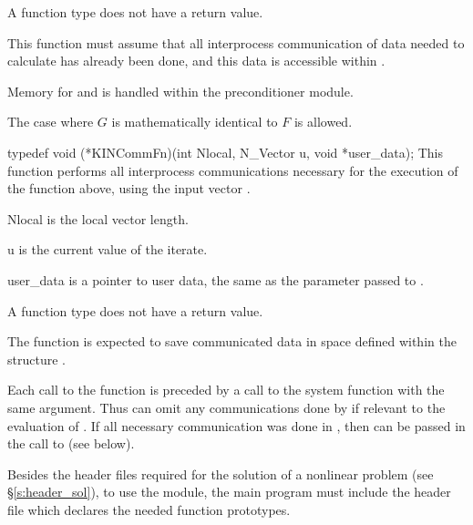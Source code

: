 {
  A  function type does not have a return value.
}
{
  This function must assume that all interprocess communication of data needed to 
  calculate  has already been done, and this data is accessible within
  .

   Memory for  and  is handled within the preconditioner module.

  The case where $G$ is mathematically identical to $F$ is allowed.
}
{
  typedef void (*KINCommFn)(int Nlocal, N\_Vector u, void *user\_data);
}
{
  This  function performs all interprocess communications necessary 
  for the execution of the  function above, using the input vector .
}
{
  \begin{args}[Nlocal]
  \item[Nlocal] 
    is the local vector length.
  \item[u]
    is the current value of the iterate.
  \item[user\_data]
    is a pointer to user data, the same as the       
    parameter passed to .  
  \end{args}
}
{
  A  function type does not have a return value.
}
{
  The  function is expected to save communicated data in space defined
  within the structure . 

  Each call to the  function is preceded by a call to the system function
   with the same  argument.  Thus  can omit 
  any communications done by  if relevant to the evaluation of .
  If all necessary communication was done in , then 
  can be passed in the call to  (see below).
}

Besides the header files required for the solution of a nonlinear problem
(see \S\ref{s:header_sol}),  to use the {\kinbbdpre} module, the main program 
must include the header file  which declares the needed
function prototypes.

